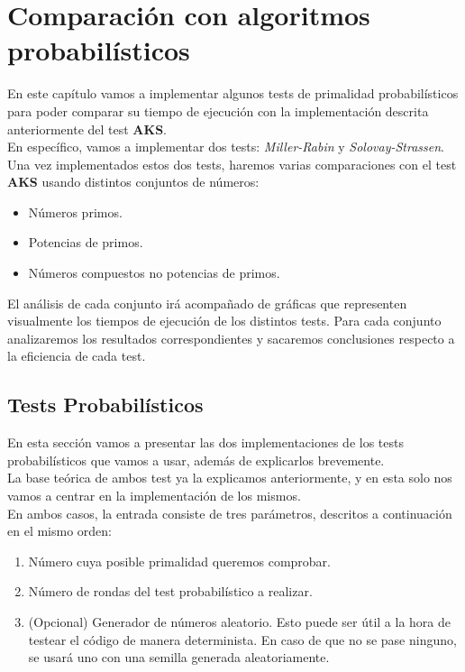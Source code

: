 \chapter{Comparación con algoritmos probabilísticos}

En este capítulo vamos a implementar algunos tests de primalidad probabilísticos para poder comparar su tiempo de ejecución con la implementación descrita anteriormente del test \textbf{AKS}.\\

En específico, vamos a implementar dos tests: \textit{Miller-Rabin} y \textit{Solovay-Strassen}. Una vez implementados estos dos tests, haremos varias comparaciones con el test \textbf{AKS} usando distintos conjuntos de números:

\begin{itemize}
	\item Números primos.
	\item Potencias de primos.
	\item Números compuestos no potencias de primos.
\end{itemize}

El análisis de cada conjunto irá acompañado de gráficas que representen visualmente los tiempos de ejecución de los distintos tests. Para cada conjunto analizaremos los resultados correspondientes y sacaremos conclusiones respecto a la eficiencia de cada test.

\section{Tests Probabilísticos}

En esta sección vamos a presentar las dos implementaciones de los tests probabilísticos que vamos a usar, además de explicarlos brevemente.\\

La base teórica de ambos test ya la explicamos anteriormente, y en esta solo nos vamos a centrar en la implementación de los mismos.\\

En ambos casos, la entrada consiste de tres parámetros, descritos a continuación en el mismo orden:

\begin{enumerate}
	\item Número cuya posible primalidad queremos comprobar.
	\item Número de rondas del test probabilístico a realizar.
	\item (Opcional) Generador de números aleatorio. Esto puede ser útil a la hora de testear el código de manera determinista. En caso de que no se pase ninguno, se usará uno con una semilla generada aleatoriamente.
\end{enumerate}

